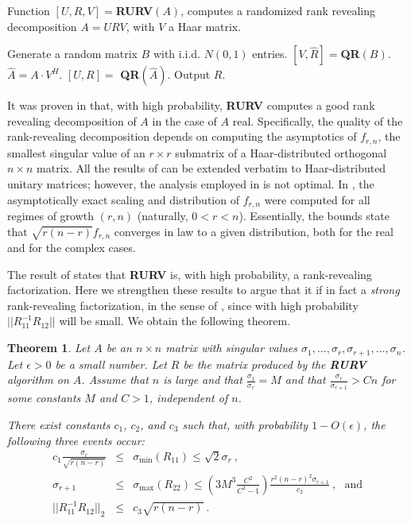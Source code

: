 \documentclass{article}
\newtheorem{theorem}{Theorem}[section]
\theoremstyle{definition}
\begin{document}
\begin{algorithm}
\protect\caption{Function $[U, R, V] =$\textbf{RURV}$(A)$, computes a randomized rank revealing decomposition $A = URV$, with $V$ a Haar matrix.} 
\begin{algorithmic}[1]
\label{rurv}
\STATE Generate a random matrix $B$ with i.i.d. $N(0,1)$ entries. 
\STATE $[V, \hat{R}] = $\textbf{QR}$(B)$.
\STATE $\hat{A} = A \cdot V^{H}$.
\STATE $[U,R] =$ \textbf{QR}$(\hat{A})$.
\STATE Output $R$.
\end{algorithmic}
\end{algorithm}

It was proven in \cite{DDH07} that, with high probability, \textbf{RURV} computes a good rank revealing decomposition of $A$ in the case of $A$ real. Specifically, the quality of the rank-revealing decomposition depends on computing the asymptotics of $f_{r,n}$, the smallest singular value of an $r \times r$ submatrix of a Haar-distributed orthogonal $n \times n$ matrix. All the results of \cite{DDH07} can be extended verbatim to Haar-distributed unitary matrices; however, the analysis employed in \cite{DDH07} is not optimal. In \cite{dumitriu10a}, the asymptotically exact scaling and distribution of $f_{r,n}$ were computed for all regimes of growth $(r,n)$ (naturally, $0 < r < n$). Essentially, the bounds state that $\sqrt{r(n-r)} f_{r,n}$ converges in law to a given distribution, both for the real and for the complex cases. 

The result of \cite{DDH07} states that \textbf{RURV} is, with high probability, a rank-revealing factorization. Here we strengthen these results to argue that it if in fact a \emph{strong} rank-revealing factorization, in the sense of \cite{GE96}, since with high probability $||R_{11}^{-1} R_{12}||$ will be small. We obtain the following theorem. 

\begin{theorem} \label{thm_rurv}  Let $A$ be an $n \times n$ matrix with singular values $\sigma_1, \ldots, \sigma_r, \sigma_{r+1}, \ldots, \sigma_n$. Let $\epsilon>0$ be a small number. Let $R$ be the matrix produced by the \textbf{RURV} algorithm on $A$.  Assume that $n$ is large and that $\frac{\sigma_1}{\sigma_r} = M$ and that $\frac{\sigma_{r}}{\sigma_{r+1}} > C n$ for some constants $M$ and $C>1$, independent of $n$. 

There exist constants $c_1$, $c_2$, and $c_3$ such that, with probability $1 - O(\epsilon)$, the following three events occur:
\begin{eqnarray*}
c_1 \frac{\sigma_{r}}{\sqrt{r (n-r)}} & \leq & \sigma_{\min}(R_{11}) \leq \sqrt{2} \sigma_r ~,\\
\sigma_{r+1} & \leq & \sigma_{\max} (R_{22}) \leq \left (3 M^3 \frac{C^2}{C^2-1}\right) \frac{r^2(n-r)^2 \sigma_{r+1}}{c_2}~, ~~~\mbox{and}\\
||R_{11}^{-1} R_{12}||_2 & \leq & c_3 \sqrt{r (n-r)}~.
\end{eqnarray*}
\end{theorem}
\end{document}
